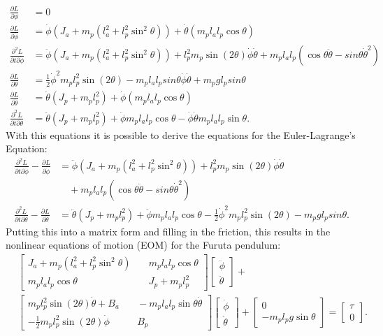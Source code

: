 \begin{align*}
	\frac{\partial L}{\partial \phi}&=0\\
	\frac{\partial L}{\partial 
	\dot{\phi}}&=\dot{\phi}(J_a+m_p(l_a^2+l_p^2\sin^2\theta))+\dot{\theta}(
	m_pl_al_p\cos\theta)\\
	\frac{\partial^2 L}{\partial t \partial \dot{\phi}}&= 
	\ddot{\phi}(J_a+m_p(l_a^2+l_p^2\sin^2 \theta))+l_p^2m_p\sin(2\theta)
	\dot{\phi}\dot{\theta}+m_pl_al_p(\cos 
	\theta\ddot{\theta}-sin\theta \dot{\theta}^2)\\
	\frac{\partial L}{\partial 
	\theta}&=\frac{1}{2}\dot{\phi}^2m_pl_p^2\sin(2\theta)-m_pl_al_psin\theta\dot{\phi}
	\dot{\theta}+m_pgl_psin\theta\\
	\frac{\partial L}{\partial 
		\dot{\theta}}&=\dot{\theta}(J_p+m_pl_p^2)+\dot{\phi}(m_pl_al_p\cos\theta)\\
	\frac{\partial^2 L}{\partial t \partial 
	\dot{\theta}}&=\ddot{\theta}(J_p+m_pl_p^2)+\ddot{\phi}m_pl_al_p\cos\theta-\dot{\phi}
	\dot{\theta}m_pl_al_p\sin\theta.
\end{align*}
With this equations it is possible to derive the equations for the 
Euler-Lagrange's Equation:
\begin{align*}
\frac{\partial^2 L}{\partial t\partial\dot{\phi}}-\frac{\partial 
L}{\partial\dot{\phi}}&=\ddot{\phi}(J_a+m_p(l_a^2+l_p^2\sin^2 
\theta))+l_p^2m_p\sin(2\theta)
\dot{\phi}\dot{\theta}\\ &\quad + m_pl_al_p(\cos 
\theta\ddot{\theta}-sin\theta \dot{\theta}^2)\\
\frac{\partial^2 L}{\partial t\partial\dot{\theta}}-\frac{\partial 
L}{\partial\dot{\theta}}&=\ddot{\theta}(J_p+m_pl_p^2)+\ddot{\phi}m_pl_al_p\cos\theta-\frac{1}{2}\dot{\phi}^2m_pl_p^2\sin(2\theta)-m_pgl_psin\theta
.\end{align*}
Putting this into a matrix form and filling in the friction, this results in 
the nonlinear equations of motion (EOM) for the Furuta pendulum:
\begin{align*}
&\begin{bmatrix}
J_a+m_p(l_a^2+l_p^2\sin^2\theta)& \quad m_pl_al_p\cos\theta \\ 
m_pl_al_p\cos\theta& \quad J_p+m_pl_p^2 
\end{bmatrix} 
\begin{bmatrix}
\ddot{\phi}\\
\ddot{\theta}
\end{bmatrix} + \\
&\begin{bmatrix}
m_pl_p^2\sin(2\theta)\dot{\theta}+ B_a& \quad -m_pl_al_p\sin \theta 
\dot{\theta}\\
-\frac{1}{2}m_pl_p^2\sin(2\theta)\dot{\phi} &\quad B_p
\end{bmatrix}
\begin{bmatrix}
\dot{\phi}\\
\dot{\theta}
\end{bmatrix} +
\begin{bmatrix}
0\\
-m_pl_pg\sin\theta
\end{bmatrix}=\begin{bmatrix}
\tau \\
0
\end{bmatrix}.
\end{align*}
